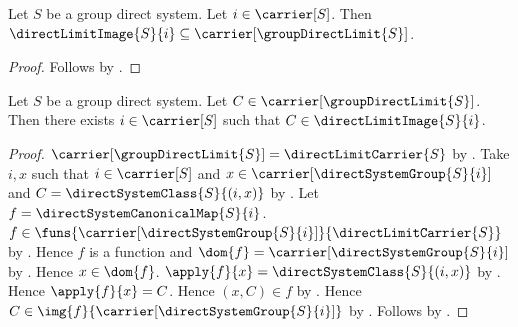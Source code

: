\begin{corollary}\label{direct_limit_image_subseteq_carrier}
    Let $S$ be a group direct system.
    Let $i\in\carrier[S]$.
    Then $\directLimitImage{S}{i}\subseteq
        \carrier[\groupDirectLimit{S}]$.
\end{corollary}
\begin{proof}
    Follows by
        .
\end{proof}

\begin{theorem}\label{direct_limit_image_coverage}
    Let $S$ be a group direct system.
    Let $C\in\carrier[\groupDirectLimit{S}]$.
    Then there exists $i\in\carrier[S]$ such that
        $C\in\directLimitImage{S}{i}$.
\end{theorem}
\begin{proof}
    $\carrier[\groupDirectLimit{S}]=\directLimitCarrier{S}$ by
        .
    Take $i,x$ such that $i\in\carrier[S]$ and
        $x\in\carrier[\directSystemGroup{S}{i}]$ and
        $C=\directSystemClass{S}{(i,x)}$ by
        .
    Let $f=\directSystemCanonicalMap{S}{i}$.
    $f\in\funs{\carrier[\directSystemGroup{S}{i}]}
        {\directLimitCarrier{S}}$ by
        .
    Hence $f$ is a function and
        $\dom{f}=\carrier[\directSystemGroup{S}{i}]$ by
        .
    Hence $x\in\dom{f}$.
    $\apply{f}{x}=\directSystemClass{S}{(i,x)}$ by
        .
    Hence $\apply{f}{x}=C$.
    Hence $(x,C)\in f$ by
        .
    Hence $C\in\img{f}{\carrier[\directSystemGroup{S}{i}]}$ by
        .
    Follows by .
\end{proof}

